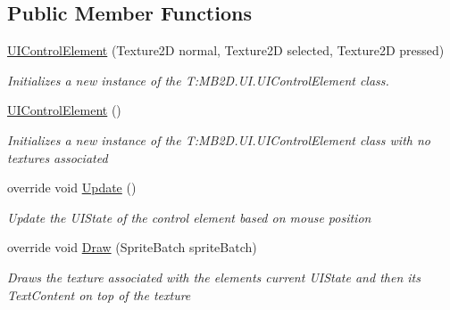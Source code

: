 \subsection*{Public Member Functions}
\begin{DoxyCompactItemize}
\item 
\hyperlink{class_m_b2_d_1_1_u_i_1_1_u_i_control_element_a5a0efcc50372be5e932eafeb13574a98}{U\+I\+Control\+Element} (Texture2D normal, Texture2D selected, Texture2D pressed)
\begin{DoxyCompactList}\small\item\em Initializes a new instance of the T\+:\+M\+B2\+D.\+U\+I.\+U\+I\+Control\+Element class. \end{DoxyCompactList}\item 
\hyperlink{class_m_b2_d_1_1_u_i_1_1_u_i_control_element_a7d846b2bfa9085ebb012663d75912fc1}{U\+I\+Control\+Element} ()
\begin{DoxyCompactList}\small\item\em Initializes a new instance of the T\+:\+M\+B2\+D.\+U\+I.\+U\+I\+Control\+Element class with no textures associated \end{DoxyCompactList}\item 
override void \hyperlink{class_m_b2_d_1_1_u_i_1_1_u_i_control_element_aa43f7ea6155de3086efbf29396ea2ccf}{Update} ()
\begin{DoxyCompactList}\small\item\em Update the U\+I\+State of the control element based on mouse position \end{DoxyCompactList}\item 
override void \hyperlink{class_m_b2_d_1_1_u_i_1_1_u_i_control_element_afac0cbbbbead7c7348401075cda433ba}{Draw} (Sprite\+Batch sprite\+Batch)
\begin{DoxyCompactList}\small\item\em Draws the texture associated with the elements current U\+I\+State and then its Text\+Content on top of the texture \end{DoxyCompactList}\end{DoxyCompactItemize}
